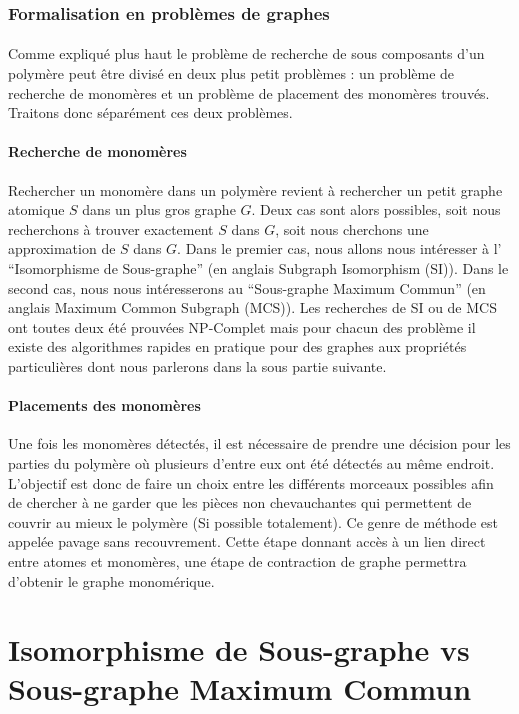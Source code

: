 \documentclass[12pt,french,twoside]{report}
\begin{document}
\subsubsection{Formalisation en problèmes de graphes}

\paragraph{}Comme expliqué plus haut le problème de recherche de sous composants d'un polymère peut être divisé en deux
plus petit problèmes : un problème de recherche de monomères et un problème de placement des monomères trouvés. Traitons
donc séparément ces deux problèmes.

\paragraph{Recherche de monomères}Rechercher un monomère dans un polymère revient à rechercher un petit graphe atomique
$S$ dans un plus gros graphe $G$. Deux cas sont alors possibles, soit nous recherchons à trouver exactement $S$ dans
$G$, soit nous cherchons une approximation de $S$ dans $G$. Dans le premier cas, nous allons nous intéresser à l'
``Isomorphisme de Sous-graphe'' (en anglais Subgraph Isomorphism (SI)). Dans le second cas, nous nous intéresserons au
``Sous-graphe Maximum Commun'' (en anglais Maximum Common Subgraph (MCS)). Les recherches de SI ou de MCS ont toutes
deux été prouvées NP-Complet mais pour chacun des problème il existe des algorithmes rapides en pratique pour des graphes
aux propriétés particulières dont nous parlerons dans la sous partie suivante.

\paragraph{Placements des monomères}Une fois les monomères détectés, il est nécessaire de prendre une décision pour les parties du polymère où plusieurs d'entre eux ont été détectés au même endroit.
L'objectif est donc de faire un choix entre les différents morceaux possibles afin de chercher à ne garder que les pièces non chevauchantes qui permettent de couvrir au mieux le polymère (Si possible totalement).
Ce genre de méthode est appelée pavage sans recouvrement.
Cette étape donnant accès à un lien direct entre atomes et monomères, une étape de contraction de graphe permettra d'obtenir le graphe monomérique.




\section{Isomorphisme de Sous-graphe vs Sous-graphe Maximum Commun}
\end{document}
